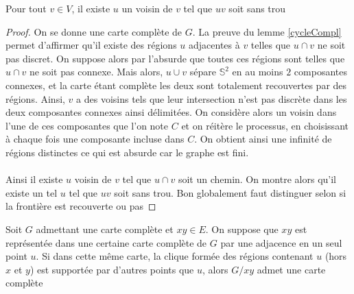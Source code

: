 \documentclass{scrartcl}
\begin{document}
\begin{flushleft}
\begin{lem}
    Pour tout $v \in V$, il existe $u$ un voisin de $v$ tel que $uv$ soit sans trou
\end{lem}

\begin{proof}
    On se donne une carte complète de $G$. La preuve du lemme \ref{cycleCompl} permet d'affirmer qu'il existe des régions $u$ adjacentes à $v$
    telles que $u \cap v$ ne soit pas discret. On suppose alors par l'absurde que toutes ces régions sont telles que $u \cap v$ ne soit
    pas connexe. Mais alors, $u \cup v$ sépare $\mathbb{S}^2$ en au moins $2$ composantes connexes, et la carte étant complète les deux sont totalement
    recouvertes par des régions. Ainsi, $v$ a des voisins tels que leur intersection n'est pas discrète dans les deux composantes connexes ainsi délimitées.
    On considère alors un voisin dans l'une de ces composantes que l'on note $C$ et on réitère le processus, en choisissant à chaque fois une composante incluse dans $C$.
    On obtient ainsi une infinité de régions distinctes ce qui est absurde car le graphe est fini.
    \\~\\
    Ainsi il existe $u$ voisin de $v$ tel que $u \cap v$ soit un chemin. On montre alors qu'il existe un tel $u$ tel que $uv$ soit sans trou.
    Bon globalement faut distinguer selon si la frontière est recouverte ou pas
\end{proof}

\begin{prop}
    Soit $G$ admettant une carte complète et $xy \in E$.
    On suppose que $xy$ est représentée dans une certaine carte complète de $G$ par une adjacence en un seul point $u$.
    Si dans cette même carte, la clique formée des régions contenant $u$ (hors $x$ et $y$) est supportée par d'autres points que $u$,
    alors $G / xy$ admet une carte complète
\end{prop}


\end{flushleft}
\end{document}
